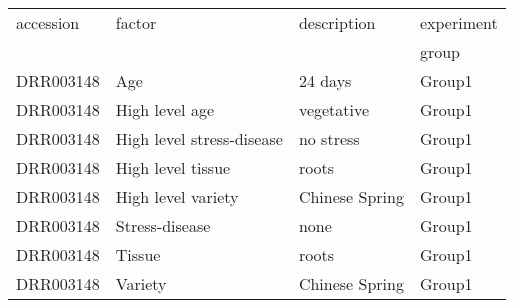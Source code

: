 \begin{tabular}{llll}
\toprule
 accession   & factor                    & description    & experiment   \\
     &                     &     & group   \\
\midrule
 DRR003148   & Age                       & 24 days        & Group1            \\
 DRR003148   & High level age            & vegetative     & Group1            \\
 DRR003148   & High level stress-disease & no stress      & Group1            \\
 DRR003148   & High level tissue         & roots          & Group1            \\
 DRR003148   & High level variety        & Chinese Spring & Group1            \\
 DRR003148   & Stress-disease            & none           & Group1            \\
 DRR003148   & Tissue                    & roots          & Group1            \\
 DRR003148   & Variety                   & Chinese Spring & Group1            \\
\bottomrule
\end{tabular}
